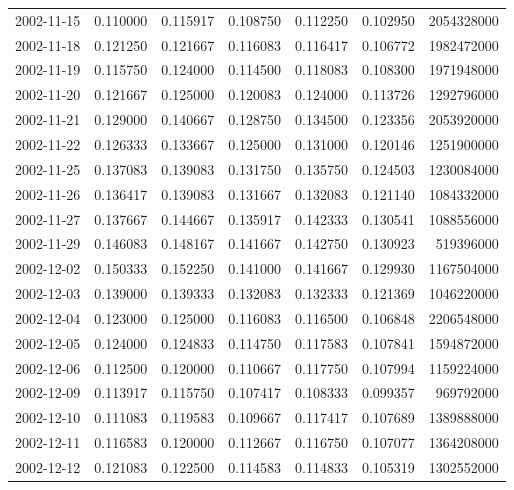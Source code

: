 \begin{tabular}{lrrrrrr}
2002-11-15 &    0.110000 &    0.115917 &    0.108750 &    0.112250 &    0.102950 &  2054328000 \\
2002-11-18 &    0.121250 &    0.121667 &    0.116083 &    0.116417 &    0.106772 &  1982472000 \\
2002-11-19 &    0.115750 &    0.124000 &    0.114500 &    0.118083 &    0.108300 &  1971948000 \\
2002-11-20 &    0.121667 &    0.125000 &    0.120083 &    0.124000 &    0.113726 &  1292796000 \\
2002-11-21 &    0.129000 &    0.140667 &    0.128750 &    0.134500 &    0.123356 &  2053920000 \\
2002-11-22 &    0.126333 &    0.133667 &    0.125000 &    0.131000 &    0.120146 &  1251900000 \\
2002-11-25 &    0.137083 &    0.139083 &    0.131750 &    0.135750 &    0.124503 &  1230084000 \\
2002-11-26 &    0.136417 &    0.139083 &    0.131667 &    0.132083 &    0.121140 &  1084332000 \\
2002-11-27 &    0.137667 &    0.144667 &    0.135917 &    0.142333 &    0.130541 &  1088556000 \\
2002-11-29 &    0.146083 &    0.148167 &    0.141667 &    0.142750 &    0.130923 &   519396000 \\
2002-12-02 &    0.150333 &    0.152250 &    0.141000 &    0.141667 &    0.129930 &  1167504000 \\
2002-12-03 &    0.139000 &    0.139333 &    0.132083 &    0.132333 &    0.121369 &  1046220000 \\
2002-12-04 &    0.123000 &    0.125000 &    0.116083 &    0.116500 &    0.106848 &  2206548000 \\
2002-12-05 &    0.124000 &    0.124833 &    0.114750 &    0.117583 &    0.107841 &  1594872000 \\
2002-12-06 &    0.112500 &    0.120000 &    0.110667 &    0.117750 &    0.107994 &  1159224000 \\
2002-12-09 &    0.113917 &    0.115750 &    0.107417 &    0.108333 &    0.099357 &   969792000 \\
2002-12-10 &    0.111083 &    0.119583 &    0.109667 &    0.117417 &    0.107689 &  1389888000 \\
2002-12-11 &    0.116583 &    0.120000 &    0.112667 &    0.116750 &    0.107077 &  1364208000 \\
2002-12-12 &    0.121083 &    0.122500 &    0.114583 &    0.114833 &    0.105319 &  1302552000 \\

\end{tabular}
